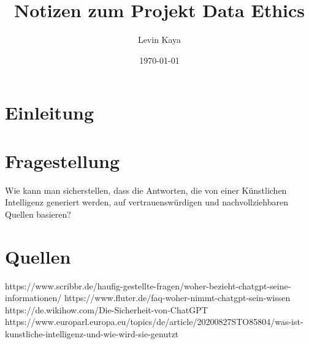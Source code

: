 \documentclass{article}
\title{Notizen zum Projekt Data Ethics}
\author{Levin Kaya}
\date{\today}
\begin{document}
\maketitle


\tableofcontents

\section{Einleitung}


\section{Fragestellung}
Wie kann man sicherstellen, dass die Antworten, die von einer Künstlichen Intelligenz generiert werden, auf vertrauenswürdigen und nachvollziehbaren Quellen basieren?


\section{Quellen}
https://www.scribbr.de/haufig-gestellte-fragen/woher-bezieht-chatgpt-seine-informationen/
https://www.fluter.de/faq-woher-nimmt-chatgpt-sein-wissen
https://de.wikihow.com/Die-Sicherheit-von-ChatGPT
https://www.europarl.europa.eu/topics/de/article/20200827STO85804/was-ist-kunstliche-intelligenz-und-wie-wird-sie-genutzt



\printbibliography
\end{document}
